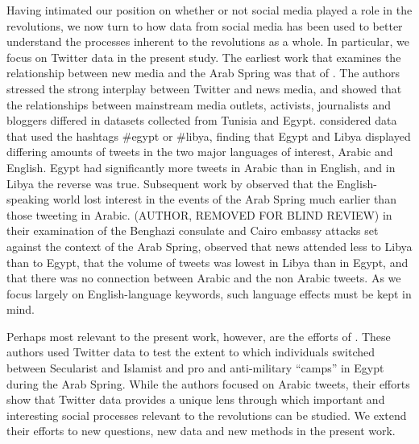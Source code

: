 Having intimated our position on whether or not social media played a role in the revolutions, we now turn to how data from social media has been used to better understand the processes inherent to the revolutions as a whole. In particular, we focus on Twitter data in the present study. The earliest work that examines the relationship between new media and the Arab Spring was that of  \cite{lotan_revolutions_2011}. The authors stressed the strong interplay between Twitter and news media, and showed that the relationships between mainstream media outlets, activists, journalists and bloggers differed in datasets collected from Tunisia and Egypt. \cite{lotan_revolutions_2011} considered data that used the hashtags \#egypt or \#libya, finding that Egypt and Libya displayed differing amounts of tweets in the two major languages of interest, Arabic and English.  Egypt had significantly more tweets in Arabic than in English, and in Libya the reverse was true. Subsequent work by \cite{bruns_arab_2013} observed that the English-speaking world lost interest in the events of the Arab Spring much earlier than those tweeting in Arabic.  (AUTHOR, REMOVED FOR BLIND REVIEW) in their examination of the Benghazi consulate and Cairo embassy attacks set against the context of the Arab Spring, observed that news attended less to Libya than to Egypt, that the volume of tweets was lowest in Libya than in Egypt, and that there was no connection between Arabic and the non Arabic tweets.  As we focus largely on English-language keywords, such language effects must be kept in mind.

Perhaps most relevant to the present work, however, are the efforts of \cite{borge-holthoefer_content_2014}. These authors used Twitter data to test the extent to which individuals switched between Secularist and Islamist and pro and anti-military ``camps'' in Egypt during the Arab Spring.  While the authors focused on Arabic tweets, their efforts show that Twitter data provides a unique lens through which important and interesting social processes relevant to the revolutions can be studied. We extend their efforts to new questions, new data and new methods in the present work.




